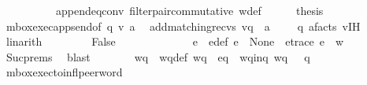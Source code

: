 \begin{isabellebody}
\ \ \ \ \ \ \ \ \ \ append{}{\isacharunderscore}{\kern0pt}eq{\isacharunderscore}{\kern0pt}conv\ filter{\isacharunderscore}{\kern0pt}pair{\isacharunderscore}{\kern0pt}commutative\ w{\isacharunderscore}{\kern0pt}def{\isacharparenright}{\kern0pt}\isanewline
\ \ \ \ \isamarkupfalse%
\ {\isacharquery}{\kern0pt}thesis\ \isamarkupfalse%
\ mbox{\isacharunderscore}{\kern0pt}exec{\isacharunderscore}{\kern0pt}app{\isacharunderscore}{\kern0pt}send{\isacharbrackleft}{\kern0pt}of\ q\ {\isachardoublequoteopen}{\isacharquery}{\kern0pt}v{\isacharprime}{\kern0pt}{\isachardoublequoteclose}\ a{\isacharbrackright}{\kern0pt}\ \isamarkupfalse%
\ {\isacartoucheopen}add{\isacharunderscore}{\kern0pt}matching{\isacharunderscore}{\kern0pt}recvs\ v{\isasymdown}\isactrlsub q\ {\isasymsqdot}\ a\ {\isacharhash}{\kern0pt}\ {\isasymepsilon}\ {\isasymin}\ {\isasymL}\isactrlsup {\isacharasterisk}{\kern0pt}\ q{\isacartoucheclose}\ a{\isacharunderscore}{\kern0pt}facts\ v{\isacharunderscore}{\kern0pt}IH\ \isamarkupfalse%
\ linarith\isanewline
\ \ \isamarkupfalse%
\isanewline
\ \ \ \ \isamarkupfalse%
\ False\ \isanewline
\ \ \ \ \ \ \isanewline
\ \ \ \ \isamarkupfalse%
\ e\ \ e{\isacharunderscore}{\kern0pt}def{\isacharcolon}{\kern0pt}\ {\isachardoublequoteopen}e\ {\isasymin}\ {\isasymT}\isactrlbsub None\isactrlesub {\isachardoublequoteclose}\ \ e{\isacharunderscore}{\kern0pt}trace{\isacharcolon}{\kern0pt}\ {\isachardoublequoteopen}e{\isasymdown}\isactrlsub {\isacharbang}{\kern0pt}\ {\isacharequal}{\kern0pt}\ w{\isachardoublequoteclose}\ \isamarkupfalse%
\ Suc{\isachardot}{\kern0pt}prems{\isacharparenleft}{\kern0pt}{}{\isacharparenright}{\kern0pt}\ \isamarkupfalse%
\ blast\isanewline
\ \ \ \ \isamarkupfalse%
\ \isamarkupfalse%
\ wq\ \ wq{\isacharunderscore}{\kern0pt}def{\isacharcolon}{\kern0pt}\ {\isachardoublequoteopen}wq\ {\isacharequal}{\kern0pt}\ e{\isasymdown}\isactrlsub q{\isachardoublequoteclose}\ \ wq{\isacharunderscore}{\kern0pt}in{\isacharunderscore}{\kern0pt}q{\isacharcolon}{\kern0pt}\ {\isachardoublequoteopen}wq\ {\isasymin}\ {\isasymL}\isactrlsup {\isacharasterisk}{\kern0pt}\ q{\isachardoublequoteclose}\ \isamarkupfalse%
\ mbox{\isacharunderscore}{\kern0pt}exec{\isacharunderscore}{\kern0pt}to{\isacharunderscore}{\kern0pt}infl{\isacharunderscore}{\kern0pt}peer{\isacharunderscore}{\kern0pt}word\ \isamarkupfalse%

\end{isabellebody}
